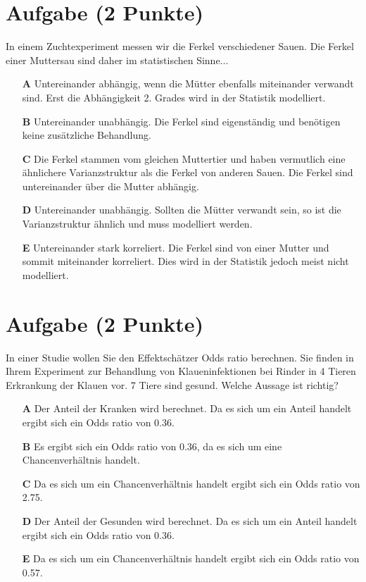 \documentclass[a4paper, 9pt]{scrartcl}\usepackage[]{graphicx}\usepackage[]{xcolor}
\begin{document}
\section{Aufgabe \hfill (2 Punkte)}



In einem Zuchtexperiment messen wir die Ferkel verschiedener Sauen. Die Ferkel einer Muttersau sind daher im statistischen Sinne...



\begin{enumerate}
\item [\textbf{A} \msquare] Untereinander abhängig, wenn die Mütter ebenfalls miteinander verwandt sind. Erst die Abhängigkeit 2. Grades wird in der Statistik modelliert.
\item [\textbf{B} \msquare] Untereinander unabhängig. Die Ferkel sind eigenständig und benötigen keine zusätzliche Behandlung.
\item [\textbf{C} \msquare] Die Ferkel stammen vom gleichen Muttertier und haben vermutlich eine ähnlichere Varianzstruktur als die Ferkel von anderen Sauen. Die Ferkel sind untereinander über die Mutter abhängig.
\item [\textbf{D} \msquare] Untereinander unabhängig. Sollten die Mütter verwandt sein, so ist die Varianzstruktur ähnlich und muss modelliert werden.
\item [\textbf{E} \msquare] Untereinander stark korreliert. Die Ferkel sind von einer Mutter und sommit miteinander korreliert. Dies wird in der Statistik jedoch meist nicht modelliert.
\end{enumerate}

\section{Aufgabe \hfill (2 Punkte)}



In einer Studie wollen Sie den Effektschätzer Odds ratio berechnen. Sie finden in Ihrem Experiment zur Behandlung von Klaueninfektionen bei Rinder in 4 Tieren Erkrankung der Klauen vor. 7 Tiere sind gesund. Welche Aussage ist richtig?



\begin{enumerate}
\item [\textbf{A} \msquare] Der Anteil der Kranken wird berechnet. Da es sich um ein Anteil handelt ergibt sich ein Odds ratio von 0.36.
\item [\textbf{B} \msquare] Es ergibt sich ein Odds ratio von 0.36, da es sich um eine Chancenverhältnis handelt.
\item [\textbf{C} \msquare] Da es sich um ein Chancenverhältnis handelt ergibt sich ein Odds ratio von 2.75.
\item [\textbf{D} \msquare] Der Anteil der Gesunden wird berechnet. Da es sich um ein Anteil handelt ergibt sich ein Odds ratio von 0.36.
\item [\textbf{E} \msquare] Da es sich um ein Chancenverhältnis handelt ergibt sich ein Odds ratio von 0.57.
\end{enumerate}
\end{document}
